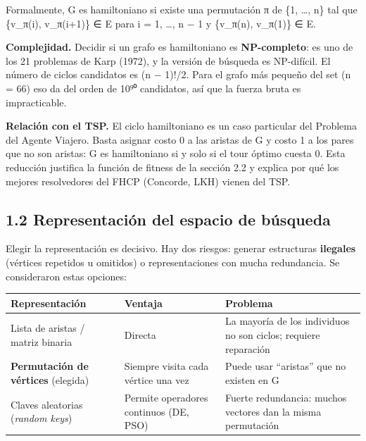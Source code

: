 \documentclass[
  spanish,
  12pt,
]{article}
\newcounter{none} %
\begin{document}
Formalmente, G es hamiltoniano si existe una permutación π de \{1,
\ldots, n\} tal que \{v\_π(i), v\_π(i+1)\} ∈ E para i = 1, \ldots, n − 1
y \{v\_π(n), v\_π(1)\} ∈ E.

\textbf{Complejidad.} Decidir si un grafo es hamiltoniano es
\textbf{NP-completo}: es uno de los 21 problemas de Karp (1972), y la
versión de búsqueda es NP-difícil. El número de ciclos candidatos es (n
− 1)!/2. Para el grafo más pequeño del set (n = 66) eso da del orden de
10⁹⁰ candidatos, así que la fuerza bruta es impracticable.

\textbf{Relación con el TSP.} El ciclo hamiltoniano es un caso
particular del Problema del Agente Viajero. Basta asignar costo 0 a las
aristas de G y costo 1 a los pares que no son aristas: G es hamiltoniano
si y solo si el tour óptimo cuesta 0. Esta reducción justifica la
función de fitness de la sección 2.2 y explica por qué los mejores
resolvedores del FHCP (Concorde, LKH) vienen del TSP.

\subsection{1.2 Representación del espacio de
búsqueda}\label{representaciuxf3n-del-espacio-de-buxfasqueda}

Elegir la representación es decisivo. Hay dos riesgos: generar
estructuras \textbf{ilegales} (vértices repetidos u omitidos) o
representaciones con mucha redundancia. Se consideraron estas opciones:

{\def\LTcaptype{none} %
\begin{longtable}[]{@{}
  >{\raggedright\arraybackslash}p{}
  >{\raggedright\arraybackslash}p{}
  >{\raggedright\arraybackslash}p{}@{}}
\toprule\noalign{}
\begin{minipage}[b]{\linewidth}\raggedright
Representación
\end{minipage} & \begin{minipage}[b]{\linewidth}\raggedright
Ventaja
\end{minipage} & \begin{minipage}[b]{\linewidth}\raggedright
Problema
\end{minipage} \\
\midrule\noalign{}
\endhead
\bottomrule\noalign{}
\endlastfoot
Lista de aristas / matriz binaria & Directa & La mayoría de los
individuos no son ciclos; requiere reparación \\
\textbf{Permutación de vértices} (elegida) & Siempre visita cada vértice
una vez & Puede usar ``aristas'' que no existen en G \\
Claves aleatorias (\emph{random keys}) & Permite operadores continuos
(DE, PSO) & Fuerte redundancia: muchos vectores dan la misma
permutación \\
\end{longtable}
}
\end{document}
